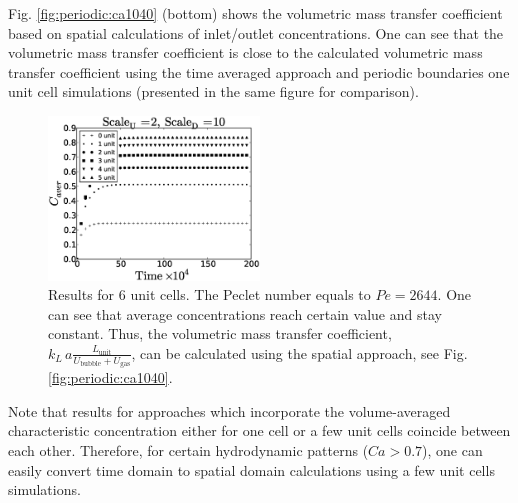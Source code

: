 \documentclass{article}
\newcommand{\vol}{k_L\,a}
\newcommand{\lunit}{L_{\mathrm{unit}}}
\newcommand{\ububble}{U_{\mathrm{bubble}}}
\newcommand{\ugas}{U_{\mathrm{gas}}}
\newcommand{\volnondim}{\vol \frac{\lunit}{\ububble+\ugas}}
\begin{document}
Fig. \ref{fig:periodic:ca1040}
(bottom) shows the volumetric mass transfer coefficient based on spatial calculations of
inlet/outlet concentrations. One can see that the volumetric mass transfer coefficient is close to
the calculated volumetric mass transfer coefficient using the time averaged approach and periodic
boundaries one unit cell simulations (presented in the same figure for comparison).
\begin{figure}[htb!]
\begin{center}
\includegraphics[width=0.5\textwidth]{Figures/aver_units6scaleu2scaled5.eps}
\end{center}
\caption{Results for $6$ unit cells. The Peclet number equals to $Pe=2644$.
One can see that average concentrations reach certain value and stay constant.
Thus, the volumetric mass transfer coefficient, $\volnondim$, can be
calculated using the spatial approach, see Fig.
\ref{fig:periodic:ca1040}.
\label{fig:6:units:ca1040}}
\end{figure}
Note
that results for approaches which incorporate the volume-averaged characteristic concentration either for one cell or a few unit cells coincide between each other. Therefore, for certain hydrodynamic patterns ($Ca>0.7$), one can
easily convert time domain to spatial domain calculations using a few unit cells simulations.
\end{document}
